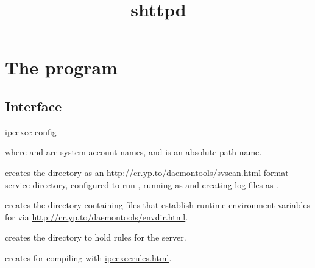 \documentclass{book}
\title{shttpd}
\begin{document}
\section{The  program}

\subsection{Interface}
\begin{code}%
  ipcexec-config   
\end{code}
where  and  are system account names,
and  is an absolute path name.

 creates the directory  as an
\href{svscan}{http://cr.yp.to/daemontools/svscan.html}-format service
directory, configured to run , running  as 
and creating log files as .

 creates the directory 
containing files that establish runtime environment variables for
 via \href{envdir}{http://cr.yp.to/daemontools/envdir.html}.

 creates the directory  to hold rules
for the  server.

 creates  for compiling
 with \href{\cmd{ipcexecrules}}{ipcexecrules.html}.
\end{document}
